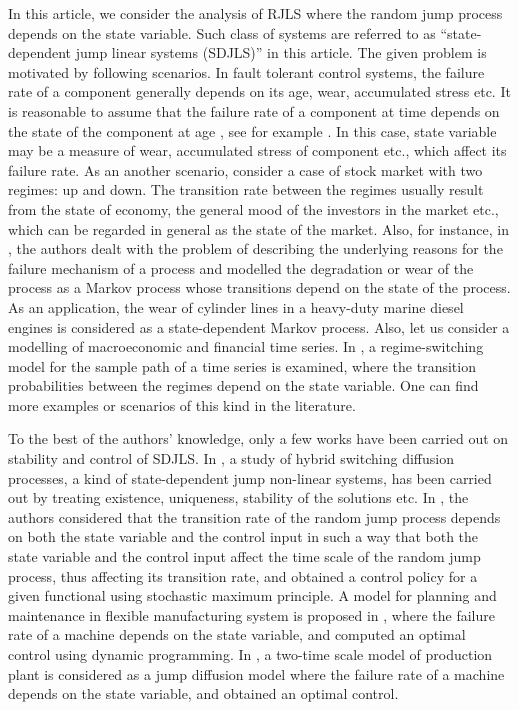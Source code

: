 \documentclass[10.5pt,a4paper]{article}
\theoremstyle{remark}
\theoremstyle{plain}
\theoremstyle{plain}
\theoremstyle{remark}
\theoremstyle{plain}
\theoremstyle{plain}
\begin{document}
In this article, we consider the analysis of RJLS where the random
jump process depends on the state variable. Such class of systems
are referred to as ``state-dependent jump linear systems (SDJLS)''
in this article. The given problem is motivated by following scenarios.
In fault tolerant control systems, the failure rate of a component
generally depends on its age, wear, accumulated stress etc. It is
reasonable to assume that the failure rate of a component at time
 depends on the state of the component at age , see for example
\cite{bergman}. In this case, state variable may be a measure of
wear, accumulated stress of component etc., which affect its failure
rate. As an another scenario, consider a case of stock market with
two regimes: up and down. The transition rate between the regimes
usually result from the state of economy, the general mood of the
investors in the market etc., which can be regarded in general as
the state of the market. Also, for instance, in \cite{motivation1},
the authors dealt with the problem of describing the underlying reasons
for the failure mechanism of a process and modelled the degradation
or wear of the process as a Markov process whose transitions depend
on the state of the process. As an application, the wear of cylinder
lines in a heavy-duty marine diesel engines is considered as a state-dependent
Markov process. Also, let us consider a modelling of macroeconomic
and financial time series. In \cite{motivation2}, a regime-switching
model for the sample path of a time series is examined, where the
transition probabilities between the regimes depend on the state variable.
One can find more examples or scenarios of this kind in the literature.

To the best of the authors' knowledge, only a few works have been
carried out on stability and control of SDJLS. In \cite{yin2009hybrid},
a study of hybrid switching diffusion processes, a kind of state-dependent
jump non-linear systems, has been carried out by treating existence,
uniqueness, stability of the solutions etc. In \cite{sworder1973},
the authors considered that the transition rate of the random jump
process depends on both the state variable and the control input in
such a way that both the state variable and the control input affect
the time scale of the random jump process, thus affecting its transition
rate, and obtained a control policy for a given functional using stochastic
maximum principle. A model for planning and maintenance in flexible
manufacturing system is proposed in \cite{boukas1990}, where the
failure rate of a machine depends on the state variable, and computed
an optimal control using dynamic programming. In \cite{filar2001},
a two-time scale model of production plant is considered as a jump
diffusion model where the failure rate of a machine depends on the
state variable, and obtained an optimal control. 
\end{document}
